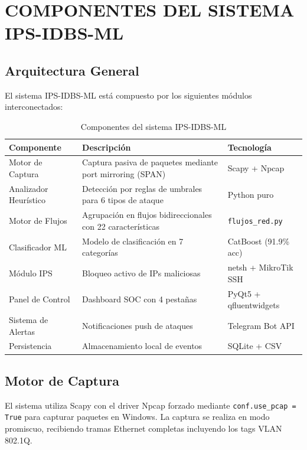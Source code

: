 \documentclass[12pt,letterpaper]{report}
\begin{document}
\chapter{COMPONENTES DEL SISTEMA IPS-IDBS-ML}

\section{Arquitectura General}

El sistema IPS-IDBS-ML está compuesto por los siguientes módulos interconectados:

\begin{table}[H]
  \centering
  \caption{Componentes del sistema IPS-IDBS-ML}
  \label{tab:componentes}
  \begin{tabularx}{\textwidth}{lXl}
    \toprule
    \textbf{Componente} & \textbf{Descripción} & \textbf{Tecnología} \\
    \midrule
    Motor de Captura & Captura pasiva de paquetes mediante port mirroring (SPAN) & Scapy + Npcap \\
    Analizador Heurístico & Detección por reglas de umbrales para 6 tipos de ataque & Python puro \\
    Motor de Flujos & Agrupación en flujos bidireccionales con 22 características & \texttt{flujos\_red.py} \\
    Clasificador ML & Modelo de clasificación en 7 categorías & CatBoost (91.9\% acc) \\
    Módulo IPS & Bloqueo activo de IPs maliciosas & netsh + MikroTik SSH \\
    Panel de Control & Dashboard SOC con 4 pestañas & PyQt5 + qfluentwidgets \\
    Sistema de Alertas & Notificaciones push de ataques & Telegram Bot API \\
    Persistencia & Almacenamiento local de eventos & SQLite + CSV \\
    \bottomrule
  \end{tabularx}
\end{table}

\section{Motor de Captura}

El sistema utiliza Scapy con el driver Npcap forzado mediante \texttt{conf.use\_pcap = True} para capturar paquetes en Windows. La captura se realiza en modo promiscuo, recibiendo tramas Ethernet completas incluyendo los tags VLAN 802.1Q.
\end{document}

